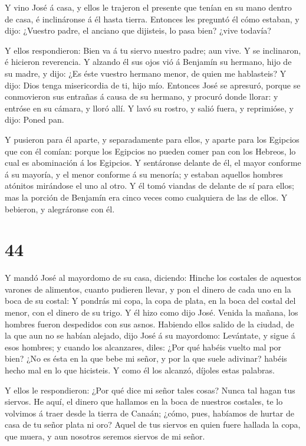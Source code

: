  Y vino José á casa, y ellos le trajeron el presente que
tenían en su mano dentro de casa, é inclináronse á él hasta tierra.
 Entonces les preguntó él cómo estaban, y dijo: ¿Vuestro
padre, el anciano que dijisteis, lo pasa bien? ¿vive todavía?

 Y ellos respondieron: Bien va á tu siervo nuestro padre;
aun vive. Y se inclinaron, é hicieron reverencia.  Y
alzando él sus ojos vió á Benjamín su hermano, hijo de su madre, y dijo:
¿Es éste vuestro hermano menor, de quien me hablasteis? Y dijo: Dios
tenga misericordia de ti, hijo mío.  Entonces José se
apresuró, porque se conmovieron sus entrañas á causa de su hermano, y
procuró donde llorar: y entróse en su cámara, y lloró allí.
 Y lavó su rostro, y salió fuera, y reprimióse, y dijo:
Poned pan.

 Y pusieron para él aparte, y separadamente para ellos, y
aparte para los Egipcios que con él comían: porque los Egipcios no
pueden comer pan con los Hebreos, lo cual es abominación á los Egipcios.
 Y sentáronse delante de él, el mayor conforme á su
mayoría, y el menor conforme á su menoría; y estaban aquellos hombres
atónitos mirándose el uno al otro.  Y él tomó viandas de
delante de sí para ellos; mas la porción de Benjamín era cinco veces
como cualquiera de las de ellos. Y bebieron, y alegráronse con él.

\hypertarget{section-43}{%
\section{44}\label{section-43}}

 Y mandó José al mayordomo de su casa, diciendo: Hinche los
costales de aquestos varones de alimentos, cuanto pudieren llevar, y pon
el dinero de cada uno en la boca de su costal:  Y pondrás mi
copa, la copa de plata, en la boca del costal del menor, con el dinero
de su trigo. Y él hizo como dijo José.  Venida la mañana,
los hombres fueron despedidos con sus asnos.  Habiendo ellos
salido de la ciudad, de la que aun no se habían alejado, dijo José á su
mayordomo: Levántate, y sigue á esos hombres; y cuando los alcanzares,
diles: ¿Por qué habéis vuelto mal por bien?  ¿No es ésta en
la que bebe mi señor, y por la que suele adivinar? habéis hecho mal en
lo que hicisteis.  Y como él los alcanzó, díjoles estas
palabras.

 Y ellos le respondieron: ¿Por qué dice mi señor tales
cosas? Nunca tal hagan tus siervos.  He aquí, el dinero que
hallamos en la boca de nuestros costales, te lo volvimos á traer desde
la tierra de Canaán; ¿cómo, pues, habíamos de hurtar de casa de tu señor
plata ni oro?  Aquel de tus siervos en quien fuere hallada
la copa, que muera, y aun nosotros seremos siervos de mi señor.

